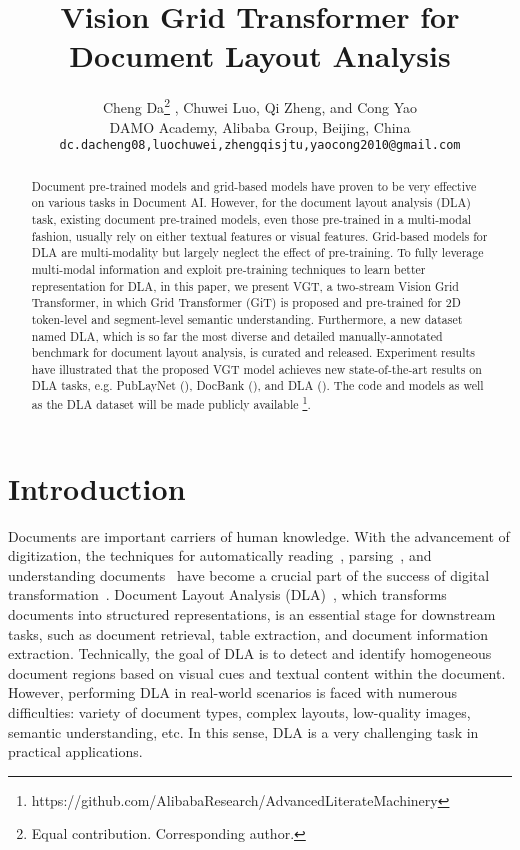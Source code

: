 \documentclass[10pt,twocolumn,letterpaper]{article}
\begin{document}
\title{Vision Grid Transformer for Document Layout Analysis}

\author{Cheng Da\thanks{Equal contribution.  Corresponding author.} , Chuwei Luo, Qi Zheng, and Cong Yao  \\
DAMO Academy, Alibaba Group, Beijing, China\\
{\tt\small {dc.dacheng08,luochuwei,zhengqisjtu,yaocong2010}@gmail.com}
}

\maketitle
\ificcvfinal\thispagestyle{empty}\fi

\begin{abstract}
Document pre-trained models and grid-based models have proven to be very effective on various tasks in Document AI. However, for the document layout analysis (DLA) task, existing document pre-trained models, even those pre-trained in a multi-modal fashion, usually rely on either textual features or visual features. Grid-based models for DLA are multi-modality but largely neglect the effect of pre-training. To fully leverage multi-modal information and exploit pre-training techniques to learn better representation for DLA, in this paper, we present VGT, a two-stream Vision Grid Transformer, in which Grid Transformer (GiT) is proposed and pre-trained for 2D token-level and segment-level semantic understanding. Furthermore, a new dataset named DLA, which is so far the most diverse and detailed manually-annotated benchmark for document layout analysis, is curated and released. Experiment results have illustrated that the proposed VGT model achieves new state-of-the-art results on DLA tasks, e.g. PubLayNet (), DocBank (), and DLA (). The code and models as well as the DLA dataset will be made publicly available \footnote{https://github.com/AlibabaResearch/AdvancedLiterateMachinery}.
\end{abstract}

\section{Introduction}

Documents are important carriers of human knowledge.
With the advancement of digitization, the techniques for automatically reading~\cite{Shi2015AnET,Zhou2017EASTAE,Shi2019ASTERAA,mgp,levocr}, parsing~\cite{Zhu2015SceneTD,Long2018SceneTD}, and understanding documents~\cite{Luo_2023_CVPR,Yang2023ModelingEA,huang2022layoutlmv3,li2022dit} have become a crucial part of the success of digital transformation~\cite{cui2021document}.
Document Layout Analysis (DLA)~\cite{binmakhashen2019document}, which transforms documents into structured representations, is an essential stage for downstream tasks, such as document retrieval, table extraction, and document information extraction.
Technically, the goal of DLA is to detect and identify homogeneous document regions based on visual cues and textual content within the document.
However, performing DLA in real-world scenarios is faced with numerous difficulties: 
variety of document types, complex layouts, low-quality images, semantic understanding, etc.
In this sense, DLA is a very challenging task in practical applications.
\end{document}
